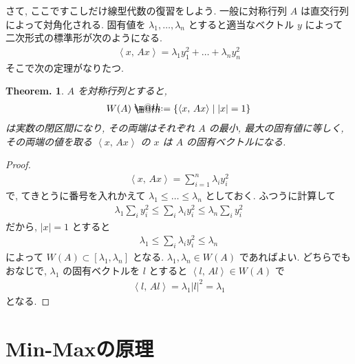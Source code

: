 \documentclass[openany, a4paper, oneside]{jsbook}
\makeatletter
\newcommand*{\defeq}{\mathrel{\rlap{%
\raisebox{0.3ex}{$\m@th\cdot$}}%
\raisebox{-0.3ex}{$\m@th\cdot$}}%
=}
\theoremstyle{break}
\theoremstyle{breakdefn}
\newtheorem{thm}{Theorem.}[section]
\newcommand{\abs}[1]{\left|#1\right|}
\newcommand{\bkt}[2]{\left\langle#1,\,#2\right\rangle}
\newcommand{\relmiddle}[1]{\mathrel{}\middle#1\mathrel{}}
\newcommand{\set}[2]{\left\{#1 \relmiddle| #2\right\}}
\makeatother
\begin{document}
さて, ここですこしだけ線型代数の復習をしよう.
一般に対称行列 $A$ は直交行列によって対角化される.
固有値を $\lambda_1, \dots, \lambda_n$ とすると適当なベクトル $y$ によって二次形式の標準形が次のようになる.
\begin{align}
 \bkt{x}{Ax}
 =
 \lambda_1 y_1^2 + \dots + \lambda_n y_n^2
\end{align}
そこで次の定理がなりたつ.
\begin{thm}
 $A$ を対称行列とすると,
 \begin{align}
  W(A)
  \defeq
  \set{\bkt{x}{Ax}}{|x| = 1}
 \end{align}
 は実数の閉区間になり, その両端はそれぞれ $A$ の最小, 最大の固有値に等しく,
 その両端の値を取る $\bkt{x}{Ax}$ の $x$ は $A$ の固有ベクトルになる.
\end{thm}
\begin{proof}
\begin{align}
 \bkt{x}{Ax}
 =
 \sum_{i=1}^n \lambda_i y_i^2
\end{align}
で, てきとうに番号を入れかえて $\lambda_1 \le \dots \le \lambda_n$ としておく.
ふつうに計算して
\begin{align}
 \lambda_1 \sum_i y_i^2
 \le
 \sum_i \lambda_i y_i^2
 \le
 \lambda_n \sum_i y_i^2
\end{align}
だから, $\abs{x}=1$ とすると
\begin{align}
 \lambda_1
 \le
 \sum_i \lambda_i y_i^2
 \le
 \lambda_n
\end{align}
によって $W(A) \subset [\lambda_1, \lambda_n]$
となる.
$\lambda_1, \lambda_n \in W(A)$ であればよい.
どちらでもおなじで, $\lambda_1$ の固有ベクトルを $l$ とすると $\bkt{l}{Al} \in W(A)$ で
\begin{align}
 \bkt{l}{Al}
 =
 \lambda_1 \abs{l}^2
 =
 \lambda_1
\end{align}
となる.
\end{proof}
\section{Min-Maxの原理}
\end{document}
